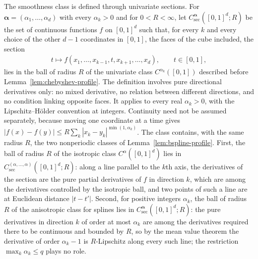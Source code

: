 The smoothness class is defined through univariate sections. For $\boldsymbol\alpha=(\alpha_1,\ldots,\alpha_d)$ with every $\alpha_k>0$ and for $0<R<\infty$, let $C^{\boldsymbol\alpha}_{\mathrm{sec}}([0,1]^d;R)$ be the set of continuous functions $f$ on $[0,1]^d$ such that, for every $k$ and every choice of the other $d-1$ coordinates in $[0,1]$, the faces of the cube included, the section
\begin{align*}
t\mapsto f(x_1,\ldots,x_{k-1},t,x_{k+1},\ldots,x_d),
\qquad t\in[0,1],
\end{align*}
lies in the ball of radius $R$ of the univariate class $C^{\alpha_k}([0,1])$ described before Lemma~\ref{lem:chebyshev-profile}. The definition involves pure directional derivatives only: no mixed derivative, no relation between different directions, and no condition linking opposite faces. It applies to every real $\alpha_k>0$, with the Lipschitz--H\"older convention at integers. Continuity need not be assumed separately, because moving one coordinate at a time gives $|f(x)-f(y)|\leq R\sum_k|x_k-y_k|^{\min(1,\alpha_k)}$. The class contains, with the same radius $R$, the two nonperiodic classes of Lemma~\ref{lem:bspline-profile}. First, the ball of radius $R$ of the isotropic class $C^\alpha([0,1]^d)$ lies in $C^{(\alpha,\ldots,\alpha)}_{\mathrm{sec}}([0,1]^d;R)$: along a line parallel to the $k$th axis, the derivatives of the section are the pure partial derivatives of $f$ in direction $k$, which are among the derivatives controlled by the isotropic ball, and two points of such a line are at Euclidean distance $|t-t'|$. Second, for positive integers $\alpha_k$, the ball of radius $R$ of the anisotropic class for splines lies in $C^{\boldsymbol\alpha}_{\mathrm{sec}}([0,1]^d;R)$: the pure derivatives in direction $k$ of order at most $\alpha_k$ are among the derivatives required there to be continuous and bounded by $R$, so by the mean value theorem the derivative of order $\alpha_k-1$ is $R$-Lipschitz along every such line; the restriction $\max_k\alpha_k\leq q$ plays no role.


